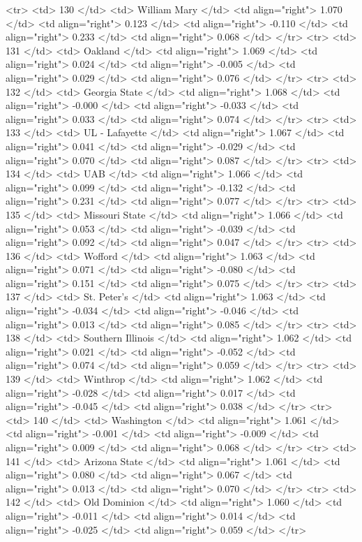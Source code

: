   <tr> <td> 130 </td> <td> William Mary </td> <td align="right"> 1.070 </td> <td align="right"> 0.123 </td> <td align="right"> -0.110 </td> <td align="right"> 0.233 </td> <td align="right"> 0.068 </td> </tr>
  <tr> <td> 131 </td> <td> Oakland </td> <td align="right"> 1.069 </td> <td align="right"> 0.024 </td> <td align="right"> -0.005 </td> <td align="right"> 0.029 </td> <td align="right"> 0.076 </td> </tr>
  <tr> <td> 132 </td> <td> Georgia State </td> <td align="right"> 1.068 </td> <td align="right"> -0.000 </td> <td align="right"> -0.033 </td> <td align="right"> 0.033 </td> <td align="right"> 0.074 </td> </tr>
  <tr> <td> 133 </td> <td> UL - Lafayette </td> <td align="right"> 1.067 </td> <td align="right"> 0.041 </td> <td align="right"> -0.029 </td> <td align="right"> 0.070 </td> <td align="right"> 0.087 </td> </tr>
  <tr> <td> 134 </td> <td> UAB </td> <td align="right"> 1.066 </td> <td align="right"> 0.099 </td> <td align="right"> -0.132 </td> <td align="right"> 0.231 </td> <td align="right"> 0.077 </td> </tr>
  <tr> <td> 135 </td> <td> Missouri State </td> <td align="right"> 1.066 </td> <td align="right"> 0.053 </td> <td align="right"> -0.039 </td> <td align="right"> 0.092 </td> <td align="right"> 0.047 </td> </tr>
  <tr> <td> 136 </td> <td> Wofford </td> <td align="right"> 1.063 </td> <td align="right"> 0.071 </td> <td align="right"> -0.080 </td> <td align="right"> 0.151 </td> <td align="right"> 0.075 </td> </tr>
  <tr> <td> 137 </td> <td> St. Peter's </td> <td align="right"> 1.063 </td> <td align="right"> -0.034 </td> <td align="right"> -0.046 </td> <td align="right"> 0.013 </td> <td align="right"> 0.085 </td> </tr>
  <tr> <td> 138 </td> <td> Southern Illinois </td> <td align="right"> 1.062 </td> <td align="right"> 0.021 </td> <td align="right"> -0.052 </td> <td align="right"> 0.074 </td> <td align="right"> 0.059 </td> </tr>
  <tr> <td> 139 </td> <td> Winthrop </td> <td align="right"> 1.062 </td> <td align="right"> -0.028 </td> <td align="right"> 0.017 </td> <td align="right"> -0.045 </td> <td align="right"> 0.038 </td> </tr>
  <tr> <td> 140 </td> <td> Washington </td> <td align="right"> 1.061 </td> <td align="right"> -0.001 </td> <td align="right"> -0.009 </td> <td align="right"> 0.009 </td> <td align="right"> 0.068 </td> </tr>
  <tr> <td> 141 </td> <td> Arizona State </td> <td align="right"> 1.061 </td> <td align="right"> 0.080 </td> <td align="right"> 0.067 </td> <td align="right"> 0.013 </td> <td align="right"> 0.070 </td> </tr>
  <tr> <td> 142 </td> <td> Old Dominion </td> <td align="right"> 1.060 </td> <td align="right"> -0.011 </td> <td align="right"> 0.014 </td> <td align="right"> -0.025 </td> <td align="right"> 0.059 </td> </tr>

